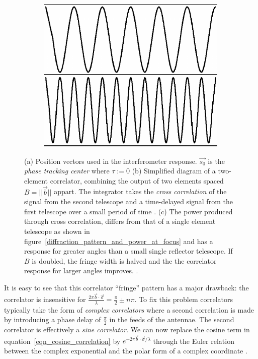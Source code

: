 \documentclass[a4paper,10pt]{report}
\begin{document}
\begin{figure}[ht]
\begin{mdframed}
\begin{subfigure}[b]{0.4\textwidth}
 \caption{}
 \end{subfigure}
 \begin{subfigure}[b]{0.2\textwidth}
 \includegraphics[width=\textwidth]{images/fringe.png}
 \caption{}
 \end{subfigure}
 \caption[Cosine correlator]{(a) Position vectors used in the interferometer response. $\vec{s_0}$ is the \textit{phase tracking center} where $\tau:=0$ \cite{taylor1999synthesis} (b) Simplified diagram of a two-element correlator, combining the output of two elements spaced $B=||\vec{b}||$ appart. The integrator takes the \textit{cross correlation} of the signal 
 from the second telescope and a time-delayed signal from the first telescope over a small period of time \cite{taylor1999synthesis}. (c) The power produced through cross correlation, differs from that of a single element telescope as shown in figure~\ref{diffraction_pattern_and_power_at_focus} and has a response for greater angles than a small single reflector telescope. If $B$ is doubled, 
 the fringe width is halved and the the correlator response for larger angles improves. \cite{wilson2009tools}.}
  \label{fig_cosine_correlator}
 \end{mdframed}
\end{figure}
It is easy to see that this correlator ``fringe'' pattern has a major drawback: the correlator is insensitive for $\frac{2\pi\vec{b}\cdot\vec{\sigma}}{\lambda} = \frac{\pi}{2} \pm n\pi$. To fix this problem correlators typically
take the form of \textit{complex correlators} where a second correlation is made by introducing a phase delay of $\frac{\pi}{2}$ in the feeds of the antennae. The second correlator is effectively a \textit{sine correlator}. We can
now replace the cosine term in equation~\ref{eqn_cosine_correlation} by $e^{-2\pi\vec{b}\cdot\vec{\sigma}/\lambda}$ through the Euler relation between the complex exponential and the polar form of a complex coordinate \cite{taylor1999synthesis}.
\end{document}
